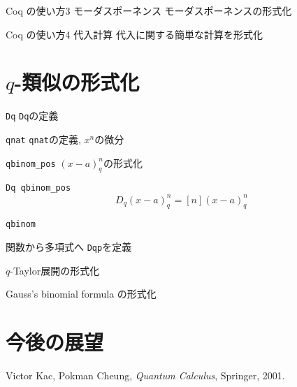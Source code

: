 \documentclass[dvipdfmx,cjk]{beamer}
\theoremstyle{mystyle}
\newcommand{\0}{\textbf{0}}
\begin{document}
\begin{frame}{Coq の使い方3 モーダスポーネンス}
  モーダスポーネンスの形式化
\end{frame}

\begin{frame}{Coq の使い方4 代入計算}
  代入に関する簡単な計算を形式化
\end{frame}
\section{$q$-類似の形式化}

\begin{frame}
  \tableofcontents[currentsection] 
\end{frame}

\begin{frame}{{\tt Dq}}
  {\tt Dq}の定義
\end{frame}

\begin{frame}{{\tt qnat}}
  {\tt qnat}の定義, $x^n$の微分
\end{frame}

\begin{frame}{\tt qbinom\_pos}
  $(x - a)^n_q$の形式化
\end{frame}

\begin{frame}{\tt Dq qbinom\_pos}
  \[
    D_q (x - a)^n_q = [n] (x - a)^n_q
  \]
\end{frame}

\begin{frame}{\tt qbinom}  
\end{frame}

\begin{frame}{関数から多項式へ}
  {\tt Dqp}を定義
\end{frame}

\begin{frame}{$q$-Taylor展開の形式化}
\end{frame}

\begin{frame}{Gauss's binomial formula の形式化}
\end{frame}
\section{今後の展望}

\begin{frame}
  \tableofcontents[currentsection] 
\end{frame}
\begin{thebibliography}{9}
   Victor Kac, Pokman Cheung, {\it{Quantum Calculus}}, Springer, 2001.
\end{thebibliography}
\end{document}
